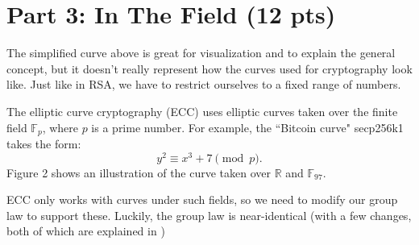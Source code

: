 \documentclass{article}
\begin{document}
\section*{Part 3: In The Field (12 pts)}
    The simplified curve above is great for visualization and to explain the general concept, but it doesn't really represent how the curves used for cryptography look like. Just like in RSA, we have to restrict ourselves to a fixed range of numbers.

    \vspace{3mm}
    The elliptic curve cryptography (ECC) uses elliptic curves taken over the finite field $\mathbb{F}_{p}$, where $p$ is a prime number. For example, the ``Bitcoin curve" secp256k1 takes the form: $$y^{2} \equiv x^{3} + 7 \pmod{p}.$$ Figure 2 shows an illustration of the curve taken over $\mathbb{R}$ and $\mathbb{F}_{97}$.

    \vspace{2mm}
    ECC only works with curves under such fields, so we need to modify our group law to support these. Luckily, the group law is near-identical (with a few changes, both of which are explained in \cite{ec_blog})
\end{document}
